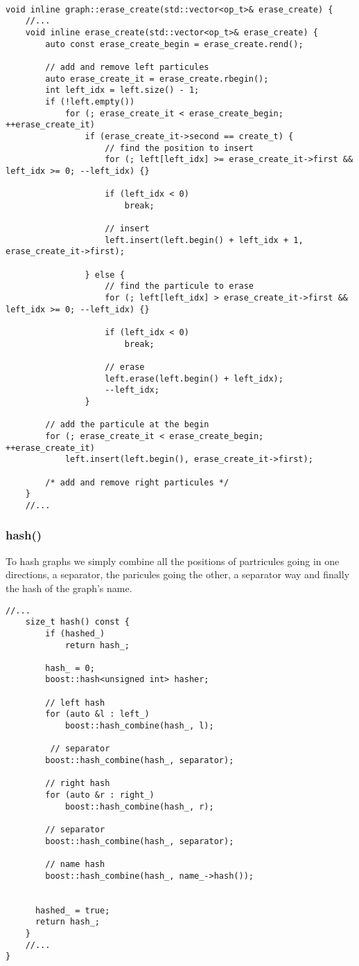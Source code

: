 \documentclass[11pt]{article}
\begin{document}
\begin{lstlisting}[style=CStyle]

void inline graph::erase_create(std::vector<op_t>& erase_create) {
	//...
	void inline erase_create(std::vector<op_t>& erase_create) {
		auto const erase_create_begin = erase_create.rend();

		// add and remove left particules
		auto erase_create_it = erase_create.rbegin();
		int left_idx = left.size() - 1;
		if (!left.empty())
			for (; erase_create_it < erase_create_begin; ++erase_create_it)
				if (erase_create_it->second == create_t) {
					// find the position to insert
					for (; left[left_idx] >= erase_create_it->first && left_idx >= 0; --left_idx) {}

					if (left_idx < 0)
						break;

					// insert
					left.insert(left.begin() + left_idx + 1, erase_create_it->first);
						
				} else {
					// find the particule to erase 
					for (; left[left_idx] > erase_create_it->first && left_idx >= 0; --left_idx) {}

					if (left_idx < 0)
						break;

					// erase
					left.erase(left.begin() + left_idx);
					--left_idx;
				}

		// add the particule at the begin
		for (; erase_create_it < erase_create_begin; ++erase_create_it)
			left.insert(left.begin(), erase_create_it->first);

		/* add and remove right particules */
	}
	//...
\end{lstlisting}

\subsubsection{hash()}

To hash graphs we simply combine all the positions of partricules going in one directions, a separator, the paricules going the other, a separator way and finally the hash of the graph's name.

\begin{lstlisting}[style=CStyle]
	//...
	size_t hash() const {
		if (hashed_)
			return hash_;

		hash_ = 0;
		boost::hash<unsigned int> hasher;

		// left hash 
		for (auto &l : left_)
			boost::hash_combine(hash_, l);

	 	 // separator 
	  	boost::hash_combine(hash_, separator);

	  	// right hash 
	  	for (auto &r : right_)
	   		boost::hash_combine(hash_, r);

	  	// separator 
	  	boost::hash_combine(hash_, separator);

	  	// name hash 
	  	boost::hash_combine(hash_, name_->hash());
			

	  hashed_ = true;
	  return hash_;
	}
	//...
}
\end{lstlisting}
\end{document}
